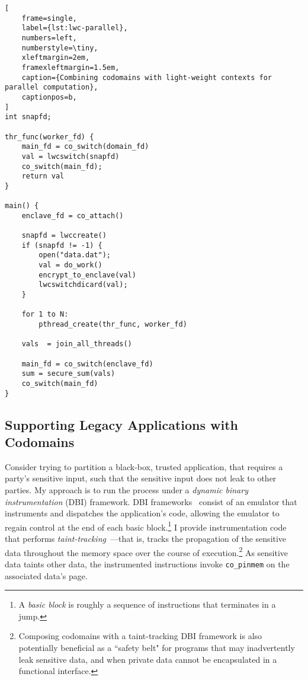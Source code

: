 \begin{lstlisting}[
    frame=single,
    label={lst:lwc-parallel},
    numbers=left,
    numberstyle=\tiny,
    xleftmargin=2em,
    framexleftmargin=1.5em,
    caption={Combining codomains with light-weight contexts for parallel computation},
    captionpos=b,
]
int snapfd;

thr_func(worker_fd) {
    main_fd = co_switch(domain_fd)
    val = lwcswitch(snapfd)
    co_switch(main_fd);
    return val
}

main() {
    enclave_fd = co_attach()

    snapfd = lwccreate()
    if (snapfd != -1) {
        open("data.dat");
        val = do_work()
        encrypt_to_enclave(val)
        lwcswitchdicard(val);
    } 

    for 1 to N:
        pthread_create(thr_func, worker_fd)
            
    vals  = join_all_threads()
     
    main_fd = co_switch(enclave_fd)
    sum = secure_sum(vals)
    co_switch(main_fd)
}
\end{lstlisting}


\subsection{Supporting Legacy Applications with Codomains}
\label{sec:codomains-legacy-apps}

Consider trying to partition a black-box, trusted application, that requires a
party's sensitive input, such that the sensitive input does not leak to other
parties.
%
My approach is to run the process under a \emph{dynamic binary
instrumentation} (DBI) framework.
%
DBI frameworks~\cite{intel-pin,dynamorio,valgrind} consist of an emulator that
instruments and dispatches the application's code, allowing the emulator to
regain control at the end of each basic block.\footnote{A \emph{basic block} is
roughly a sequence of instructions that terminates in a jump.}
%
I provide instrumentation code that performs
\emph{taint-tracking}~\cite{taint-tracking,libdft}---that is, tracks the
propagation of the sensitive data throughout the memory space over the course
of execution.\footnote{
Composing codomains with a taint-tracking DBI framework is also potentially
beneficial as a ``safety belt" for programs that may inadvertently leak
sensitive data, and when private data cannot be encapsulated in a functional
interface.
}
%
As sensitive data taints other data,
the instrumented instructions invoke \texttt{co\_pinmem} on the associated
data's page.


